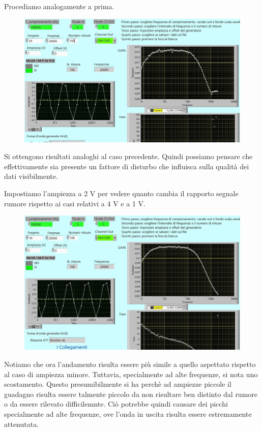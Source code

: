 Procediamo analogamente a prima.

\begin{figure}[H]
\caption{}
    \includegraphics[width=12cm]{settimana_2/immagini/rccr_6.jpg}
    \centering
\end{figure}
Si ottengono risultati analoghi al caso precedente. Quindi possiamo pensare che effettivamente sia presente un fattore di disturbo che influisca sulla qualità dei dati visibilmente.

Impostiamo l'ampiezza a 2 V per vedere quanto cambia il rapporto segnale rumore rispetto ai casi relativi a 4 V e a 1 V. 

\begin{figure}[H]
\caption{}
    \includegraphics[width=12cm]{settimana_2/immagini/rccr_7.jpg}
    \centering
\end{figure}

Notiamo che ora l'andamento risulta essere più simile a quello aspettato rispetto al caso di ampiezza minore. Tuttavia, specialmente ad alte frequenze, si nota uno scostamento. Questo presumibilmente si ha perchè ad ampiezze piccole il guadagno risulta essere talmente piccolo da non risultare ben distinto dal rumore o da essere rilevato difficilemnte. Ciò potrebbe quindi causare dei picchi specialmente ad alte frequenze, ove l'onda in uscita risulta essere estremamente attenutata.

